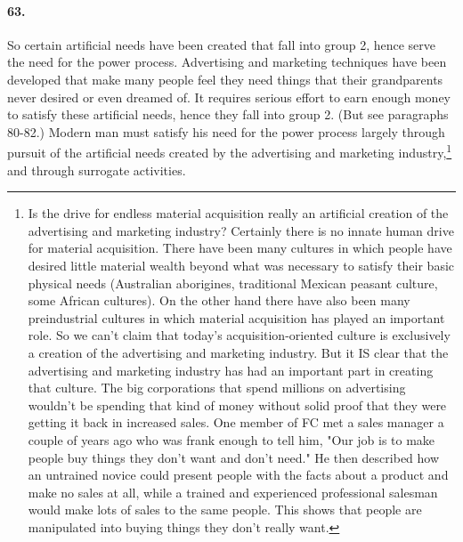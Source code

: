 \documentclass[12pt]{book}
\begin{document}
\paragraph{63.}  So certain artificial needs have been created that fall into group 2, hence serve the need for the power process. Advertising and marketing techniques have been developed that make many people feel they need things that their grandparents never desired or even dreamed of. It requires serious effort to earn enough money to satisfy these artificial needs, hence they fall into group 2. (But see paragraphs 80-82.) Modern man must satisfy his need for the power process largely through pursuit of the artificial needs created by the advertising and marketing industry,\footnote{Is the drive for endless material acquisition really an artificial creation of the advertising and marketing industry? Certainly there is no innate human drive for material acquisition. There have been many cultures in which people have desired little material wealth beyond what was necessary to satisfy their basic physical needs (Australian aborigines, traditional Mexican peasant culture, some African cultures). On the other hand there have also been many preindustrial cultures in which material acquisition has played an important role. So we can't claim that today's acquisition-oriented culture is exclusively a creation of the advertising and marketing industry. But it IS clear that the advertising and marketing industry has had an important part in creating that culture. The big corporations that spend millions on advertising wouldn't be spending that kind of money without solid proof that they were getting it back in increased sales. One member of FC met a sales manager a couple of years ago who was frank enough to tell him, "Our job is to make people buy things they don't want and don't need." He then described how an untrained novice could present people with the facts about a product and make no sales at all, while a trained and experienced professional salesman would make lots of sales to the same people. This shows that people are manipulated into buying things they don't really want.} and through surrogate activities.
\end{document}
